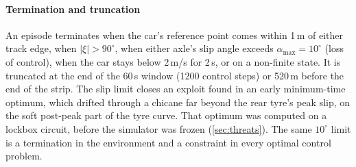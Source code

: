 \paragraph{Termination and truncation} An episode terminates when the car's reference
point comes within 1\,m of either track edge, when $|\xi| > 90^\circ$, when either axle's
slip angle exceeds $\alpha_{\max} = 10^\circ$ (loss of control), when the car stays below
2\,m/s for 2\,s, or on a non-finite state. It is truncated at the end of the 60\,s window
(\num{1200} control steps) or 520\,m before the end of the strip.
The slip limit closes an exploit found in an early minimum-time optimum, which drifted
through a chicane far beyond the rear tyre's peak slip, on the soft post-peak part of the
tyre curve. That optimum was computed on a lockbox circuit, before the simulator was
frozen (\cref{sec:threats}). The same $10^\circ$ limit is a termination in the
environment and a constraint in every optimal control problem.


